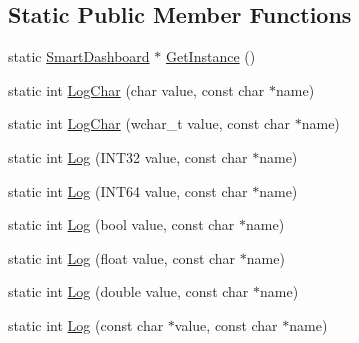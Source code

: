 \subsection*{Static Public Member Functions}
\begin{DoxyCompactItemize}
\item 
static \hyperlink{classSmartDashboard}{SmartDashboard} $\ast$ \hyperlink{classSmartDashboard_a7ae43e0ad39b62d997626b2011cf76ee}{GetInstance} ()
\item 
static int \hyperlink{classSmartDashboard_aaf01cf3a3e9aeb5a24c3268a765dd210}{LogChar} (char value, const char $\ast$name)
\item 
static int \hyperlink{classSmartDashboard_ab50c033c84036bd3924c5b00a53d495c}{LogChar} (wchar\_\-t value, const char $\ast$name)
\item 
static int \hyperlink{classSmartDashboard_a1bdecea4cdeb839fb1cbd476b043f6d6}{Log} (INT32 value, const char $\ast$name)
\item 
static int \hyperlink{classSmartDashboard_a75d16bd65e394c8e11a92201ee6d5b18}{Log} (INT64 value, const char $\ast$name)
\item 
static int \hyperlink{classSmartDashboard_a1d804fdc5d0c362de99414532142e741}{Log} (bool value, const char $\ast$name)
\item 
static int \hyperlink{classSmartDashboard_a641f1715d0333bc72d38bdfaad2db1f7}{Log} (float value, const char $\ast$name)
\item 
static int \hyperlink{classSmartDashboard_a253f9156ef7f9b5b20cb6f22319d3f91}{Log} (double value, const char $\ast$name)
\item 
static int \hyperlink{classSmartDashboard_ad22eabf2070046656f9757b17d789bc6}{Log} (const char $\ast$value, const char $\ast$name)
\end{DoxyCompactItemize}


